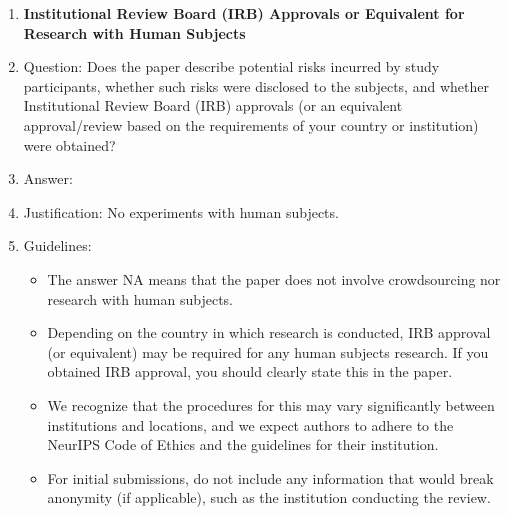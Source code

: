 \documentclass{article}
\theoremstyle{plain}
\theoremstyle{definition}
\theoremstyle{remark}
\theoremstyle{remark}
\begin{document}
\begin{enumerate}
\item {\bf Institutional Review Board (IRB) Approvals or Equivalent for Research with Human Subjects}
    \item[] Question: Does the paper describe potential risks incurred by study participants, whether such risks were disclosed to the subjects, and whether Institutional Review Board (IRB) approvals (or an equivalent approval/review based on the requirements of your country or institution) were obtained?
    \item[] Answer: \answerNA{} %
    \item[] Justification: No experiments with human subjects.
    \item[] Guidelines:
    \begin{itemize}
        \item The answer NA means that the paper does not involve crowdsourcing nor research with human subjects.
        \item Depending on the country in which research is conducted, IRB approval (or equivalent) may be required for any human subjects research. If you obtained IRB approval, you should clearly state this in the paper. 
        \item We recognize that the procedures for this may vary significantly between institutions and locations, and we expect authors to adhere to the NeurIPS Code of Ethics and the guidelines for their institution. 
        \item For initial submissions, do not include any information that would break anonymity (if applicable), such as the institution conducting the review.
    \end{itemize}

\end{enumerate}
\end{document}
